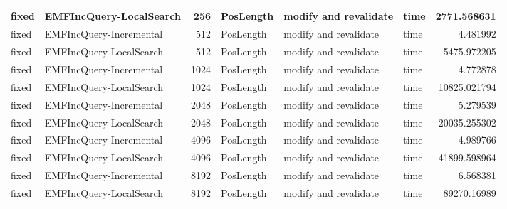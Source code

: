 \begin{table}
\begin{tabular}{| l | l | r | l | l | l | r |}
fixed & EMFIncQuery-LocalSearch & 256 & PosLength & modify and revalidate & time & 2771.568631\\\hline
fixed & EMFIncQuery-Incremental & 512 & PosLength & modify and revalidate & time & 4.481992\\\hline
fixed & EMFIncQuery-LocalSearch & 512 & PosLength & modify and revalidate & time & 5475.972205\\\hline
fixed & EMFIncQuery-Incremental & 1024 & PosLength & modify and revalidate & time & 4.772878\\\hline
fixed & EMFIncQuery-LocalSearch & 1024 & PosLength & modify and revalidate & time & 10825.021794\\\hline
fixed & EMFIncQuery-Incremental & 2048 & PosLength & modify and revalidate & time & 5.279539\\\hline
fixed & EMFIncQuery-LocalSearch & 2048 & PosLength & modify and revalidate & time & 20035.255302\\\hline
fixed & EMFIncQuery-Incremental & 4096 & PosLength & modify and revalidate & time & 4.989766\\\hline
fixed & EMFIncQuery-LocalSearch & 4096 & PosLength & modify and revalidate & time & 41899.598964\\\hline
fixed & EMFIncQuery-Incremental & 8192 & PosLength & modify and revalidate & time & 6.568381\\\hline
fixed & EMFIncQuery-LocalSearch & 8192 & PosLength & modify and revalidate & time & 89270.16989\\\hline


\end{tabular}
\end{table}
